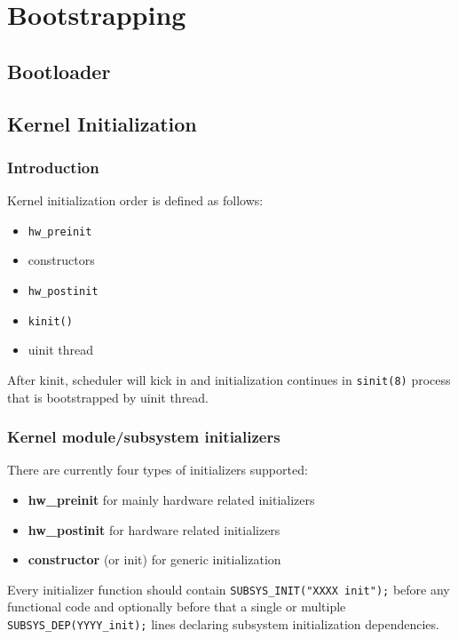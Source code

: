 \part{Bootstrapping}
\chapter{Bootloader}
\chapter{Kernel Initialization}

\section{Introduction}

Kernel initialization order is defined as follows:
\begin{itemize}
    \item \verb+hw_preinit+
    \item constructors
    \item \verb+hw_postinit+
    \item \verb+kinit()+
    \item uinit thread
\end{itemize}

After kinit, scheduler will kick in and initialization continues in
\verb+sinit(8)+ process that is bootstrapped by uinit thread.

\section{Kernel module/subsystem initializers}

There are currently four types of initializers supported:

\begin{itemize}
    \item \textbf{hw\_preinit} for mainly hardware related initializers
    \item \textbf{hw\_postinit} for hardware related initializers
    \item \textbf{constructor} (or init) for generic initialization
\end{itemize}

Every initializer function should contain \verb+SUBSYS_INIT("XXXX init");+
before any functional code and optionally before that a single or multiple
\verb+SUBSYS_DEP(YYYY_init);+ lines declaring subsystem initialization
dependencies.

